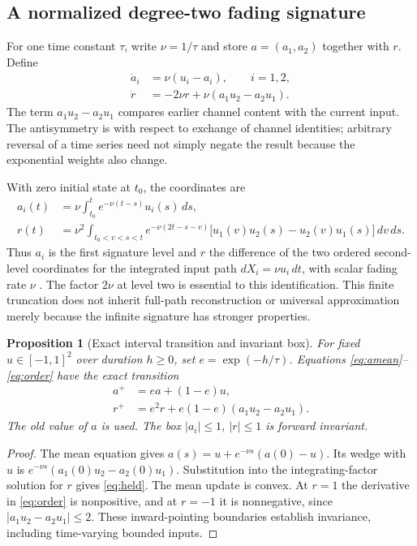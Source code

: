 \documentclass[11pt,a4paper]{article}
\newtheorem{proposition}[theorem]{Proposition}
\theoremstyle{definition}\newtheorem{definition}[theorem]{Definition}
\begin{document}
\subsection{A normalized degree-two fading signature}
For one time constant $\tau$, write $\nu=1/\tau$ and store $a=(a_1,a_2)$ together with $r$. Define
\begin{align}
 \dot a_i&=\nu(u_i-a_i),\qquad i=1,2,\label{eq:amean}\\
 \dot r&=-2\nu r+\nu(a_1u_2-a_2u_1).\label{eq:order}
\end{align}
The term $a_1u_2-a_2u_1$ compares earlier channel content with the current input. The antisymmetry is with respect to exchange of channel identities; arbitrary reversal of a time series need not simply negate the result because the exponential weights also change.

With zero initial state at $t_0$, the coordinates are
\begin{align}
 a_i(t)&=\nu\int_{t_0}^t e^{-\nu(t-s)}u_i(s)\,ds,\\
 r(t)&=\nu^2\int_{t_0<v<s<t}
 e^{-\nu(2t-s-v)}\bigl[u_1(v)u_2(s)-u_2(v)u_1(s)\bigr]\,dv\,ds.\label{eq:orderedintegral}
\end{align}
Thus $a_i$ is the first signature level and $r$ the difference of the two ordered second-level coordinates for the integrated input path $dX_i=\nu u_i\,dt$, with scalar fading rate $\nu$ \cite{abijaber2025}. The factor $2\nu$ at level two is essential to this identification. This finite truncation does not inherit full-path reconstruction or universal approximation merely because the infinite signature has stronger properties.

\begin{proposition}[Exact interval transition and invariant box]\label{prop:held}
For fixed $u\in[-1,1]^2$ over duration $h\geq0$, set $e=\exp(-h/\tau)$. Equations \eqref{eq:amean}--\eqref{eq:order} have the exact transition
\begin{align}
 a^+&=ea+(1-e)u,\\
 r^+&=e^2r+e(1-e)(a_1u_2-a_2u_1).\label{eq:held}
\end{align}
The old value of $a$ is used. The box $|a_i|\leq1$, $|r|\leq1$ is forward invariant.
\end{proposition}
\begin{proof}
The mean equation gives $a(s)=u+e^{-\nu s}(a(0)-u)$. Its wedge with $u$ is $e^{-\nu s}(a_1(0)u_2-a_2(0)u_1)$. Substitution into the integrating-factor solution for $r$ gives \eqref{eq:held}. The mean update is convex. At $r=1$ the derivative in \eqref{eq:order} is nonpositive, and at $r=-1$ it is nonnegative, since $|a_1u_2-a_2u_1|\leq2$. These inward-pointing boundaries establish invariance, including time-varying bounded inputs.
\end{proof}
\end{document}

